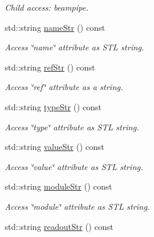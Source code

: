 \begin{DoxyCompactItemize}
\begin{DoxyCompactList}\small\item\em Child access: beampipe. \item\end{DoxyCompactList}\item 
std::string \hyperlink{struct_d_d4hep_1_1_x_m_l_1_1_dimension_a6dfa01b86f12435ae2d3fec55404b7cf}{nameStr} () const 
\begin{DoxyCompactList}\small\item\em Access \char`\"{}name\char`\"{} attribute as STL string. \item\end{DoxyCompactList}\item 
std::string \hyperlink{struct_d_d4hep_1_1_x_m_l_1_1_dimension_a6a57ea243030456557510f4044753662}{refStr} () const 
\begin{DoxyCompactList}\small\item\em Access \char`\"{}ref\char`\"{} attribute as a string. \item\end{DoxyCompactList}\item 
std::string \hyperlink{struct_d_d4hep_1_1_x_m_l_1_1_dimension_ae8e5a749f5b6ff42143e01b0fffa3c8b}{typeStr} () const 
\begin{DoxyCompactList}\small\item\em Access \char`\"{}type\char`\"{} attribute as STL string. \item\end{DoxyCompactList}\item 
std::string \hyperlink{struct_d_d4hep_1_1_x_m_l_1_1_dimension_a336539efb2d195550b7f87488abd5f46}{valueStr} () const 
\begin{DoxyCompactList}\small\item\em Access \char`\"{}value\char`\"{} attribute as STL string. \item\end{DoxyCompactList}\item 
std::string \hyperlink{struct_d_d4hep_1_1_x_m_l_1_1_dimension_a97e43369e4a27e1f8210125145fb5ff3}{moduleStr} () const 
\begin{DoxyCompactList}\small\item\em Access \char`\"{}module\char`\"{} attribute as STL string. \item\end{DoxyCompactList}\item 
std::string \hyperlink{struct_d_d4hep_1_1_x_m_l_1_1_dimension_a1a1259503fd5a87ac94ca513a5c917c7}{readoutStr} () const 

\end{DoxyCompactItemize}
